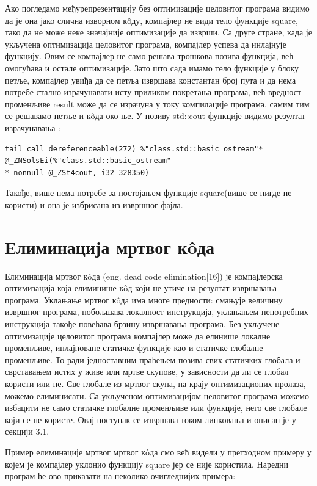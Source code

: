 \documentclass[12pt,oneside]{memoir}
\begin{document}
Ако погледамо међурепрезентацију без оптимизације целовитог програма видимо да је она јако
слична изворном к\^{o}ду, компајлер не види тело функције square, тако да не може неке 
значајније оптимизације да изврши.
Са друге стране, када је укључена оптимизација целовитог програма, компајлер
успева да инлајнује функцију.
Овим се компајлер не само решава трошкова позива функција, већ омогућава и остале оптимизације.
Зато што сада имамо тело функције у блоку петље, компајлер увиђа да се петља извршава константан
број пута и да нема потребе стално израчунавати исту приликом покретања програма, већ вредност
променљиве result може да се израчуна у току компилације програма, самим тим се решавамо петље и к\^{o}да око ње.
У позиву std::cout функције видимо резултат израчунавања :
\begin{lstlisting}[frame=single]
tail call dereferenceable(272) %"class.std::basic_ostream"*
@_ZNSolsEi(%"class.std::basic_ostream"
* nonnull @_ZSt4cout, i32 328350)
\end{lstlisting}
Такође, више нема потребе за постојањем функције square(више се нигде не користи)
и она је избрисана из извршног фајла.



\section{Елиминација мртвог к\^{o}да}

Елиминација мртвог к\^{o}да (eng. dead code elimination[16]) је компајлерска 
оптимизација која елиминише к\^{o}д који не утиче на резултат извршавања
програма.
Уклањање мртвог к\^{o}да има многе предности: смањује величину извршног програма,
побољшава локалност инструкција, уклањањем непотребних инструкција такође
повећава брзину извршавања програма.
Без укључене оптимизације целовитог програма компајлер може да елинише локалне
променљиве, инлајноване статичке функције као и статичке глобалне променљиве.
То ради једноставним праћењем позива свих статичких глобала и сврставањем истих
у живе или мртве скупове, у зависности да ли се глобал користи или не.
Све глобале из мртвог скупа, на крају оптимизационих пролаза, можемо елиминисати.
Са укљученом оптимизацијом целовитог програма можемо избацити не само статичке
глобалне променљиве или функције, него све глобале који се не користе.
Овај поступак се извршава током линковања и описан је у секцији  3.1.

Пример елиминације мртвог мртвог к\^{o}да смо већ видели у претходном примеру
у којем је компајлер уклонио функцију square јер се није користила. Наредни
програм ће ово приказати на неколико очигледнијих примера:
\end{document}
